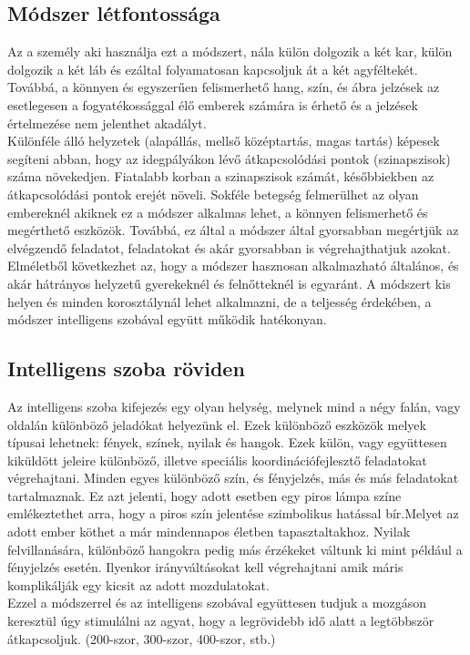 \documentclass[tocnopagenum]{thesis-ekf}
\theoremstyle{definition}
\theoremstyle{remark}
\begin{document}
	\subsection{Módszer létfontossága}
	Az a személy aki használja ezt a módszert, nála külön dolgozik a két kar, külön dolgozik a két láb és ezáltal folyamatosan kapcsoljuk át a két agyféltekét.
	Továbbá, a könnyen és egyszerűen felismerhető hang, szín, és ábra jelzések az esetlegesen a fogyatékossággal élő emberek számára is érhető és a jelzések értelmezése nem jelenthet akadályt.
	\\
	Különféle álló helyzetek (alapállás, mellső középtartás, magas tartás) képesek segíteni abban, hogy az idegpályákon lévő átkapcsolódási pontok (szinapszisok) száma növekedjen. Fiatalabb korban a szinapszisok számát, későbbiekben az átkapcsolódási pontok erejét növeli.
	Sokféle betegség felmerülhet az olyan embereknél akiknek ez a módszer alkalmas lehet, a könnyen felismerhető és megérthető eszközök.
	Továbbá, ez által a módszer által gyorsabban megértjük az elvégzendő  feladatot, feladatokat és akár gyorsabban is végrehajthatjuk azokat.
	 \\
	Elméletből következhet az, hogy a módszer hasznosan alkalmazható általános, és akár hátrányos helyzetű gyerekeknél és felnőtteknél is egyaránt.
	A módszert kis helyen és minden korosztálynál lehet alkalmazni, de a teljesség érdekében, a módszer intelligens szobával együtt működik hatékonyan.
	
	
	\subsection{Intelligens szoba röviden}
	Az intelligens szoba kifejezés egy olyan helység, melynek mind a négy falán, vagy oldalán különböző jeladókat helyezünk el.
	Ezek különböző eszközök melyek típusai lehetnek: fények, színek, nyilak és hangok. Ezek külön, vagy együttesen kiküldött jeleire különböző, illetve speciális koordinációfejlesztő feladatokat végrehajtani. Minden egyes különböző szín, és fényjelzés, más és más feladatokat tartalmaznak.
	Ez azt jelenti, hogy adott esetben egy piros lámpa színe emlékeztethet arra, hogy a piros szín jelentése szimbolikus hatással bír.Melyet az adott ember köthet a már mindennapos életben tapasztaltakhoz. Nyilak felvillanására, különböző hangokra pedig más érzékeket váltunk ki mint például a fényjelzés esetén. Ilyenkor irányváltásokat kell végrehajtani amik máris komplikálják egy kicsit az adott mozdulatokat.
	\\
	Ezzel a módszerrel és az intelligens szobával együttesen tudjuk a mozgáson keresztül úgy stimulálni az agyat, hogy a legrövidebb idő alatt a legtöbbször átkapcsoljuk. (200-szor, 300-szor, 400-szor, stb.)
	\par
\end{document}
